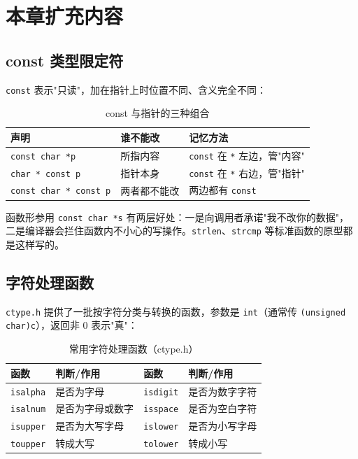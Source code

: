 
\section{本章扩充内容}
\subsection{const 类型限定符}
\texttt{const} 表示"只读"，加在指针上时位置不同、含义完全不同：

\begin{table}[htbp]
\centering
\caption{const 与指针的三种组合}
\footnotesize
\begin{tabularx}{\textwidth}{@{}p{3.9cm}p{2.6cm}X@{}}
\toprule
声明 & 谁不能改 & 记忆方法 \\
\midrule
\texttt{const char *p} & 所指内容 & \texttt{const} 在 \texttt{*} 左边，管"内容" \\
\texttt{char * const p} & 指针本身 & \texttt{const} 在 \texttt{*} 右边，管"指针" \\
\texttt{const char * const p} & 两者都不能改 & 两边都有 \texttt{const} \\
\bottomrule
\end{tabularx}
\end{table}

函数形参用 \texttt{const char *s} 有两层好处：一是向调用者承诺"我不改你的数据"，二是编译器会拦住函数内不小心的写操作。\texttt{strlen}、\texttt{strcmp} 等标准函数的原型都是这样写的。

\subsection{字符处理函数}
\texttt{ctype.h} 提供了一批按字符分类与转换的函数，参数是 \texttt{int}（通常传 \texttt{(unsigned char)c}），返回非 0 表示"真"：

\begin{table}[htbp]
\centering
\caption{常用字符处理函数（ctype.h）}
\footnotesize
\begin{tabularx}{\textwidth}{@{}p{2.4cm}Xp{2.4cm}X@{}}
\toprule
函数 & 判断/作用 & 函数 & 判断/作用 \\
\midrule
\texttt{isalpha} & 是否为字母 & \texttt{isdigit} & 是否为数字字符 \\
\texttt{isalnum} & 是否为字母或数字 & \texttt{isspace} & 是否为空白字符 \\
\texttt{isupper} & 是否为大写字母 & \texttt{islower} & 是否为小写字母 \\
\texttt{toupper} & 转成大写 & \texttt{tolower} & 转成小写 \\
\bottomrule
\end{tabularx}
\end{table}

